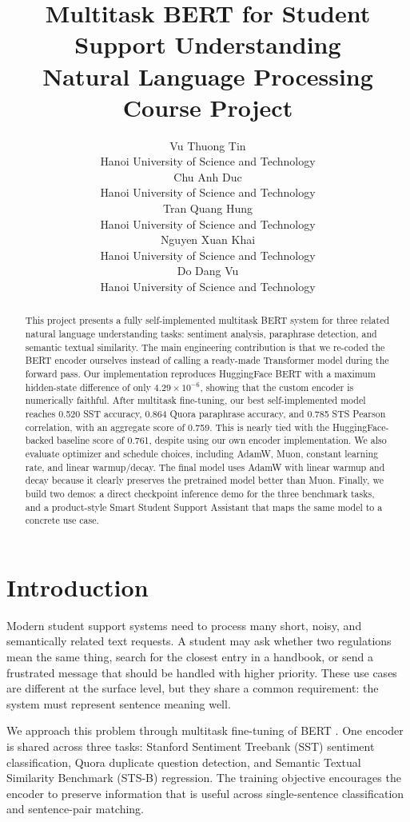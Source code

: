 \documentclass{article}
\title{
  Multitask BERT for Student Support Understanding \\
  \vspace{0.15cm}
  \large \normalfont Natural Language Processing Course Project
}
\author{
  Vu Thuong Tin \\
  Hanoi University of Science and Technology \\
  \And
  Chu Anh Duc \\
  Hanoi University of Science and Technology \\
  \And
  Tran Quang Hung \\
  Hanoi University of Science and Technology \\
  \And
  Nguyen Xuan Khai \\
  Hanoi University of Science and Technology \\
  \And
  Do Dang Vu \\
  Hanoi University of Science and Technology
}
\begin{document}
\maketitle
\vspace{-0.4cm}

\begin{abstract}
This project presents a fully self-implemented multitask BERT system for three related natural language understanding tasks: sentiment analysis, paraphrase detection, and semantic textual similarity. The main engineering contribution is that we re-coded the BERT encoder ourselves instead of calling a ready-made Transformer model during the forward pass. Our implementation reproduces HuggingFace BERT with a maximum hidden-state difference of only $4.29\times10^{-6}$, showing that the custom encoder is numerically faithful. After multitask fine-tuning, our best self-implemented model reaches 0.520 SST accuracy, 0.864 Quora paraphrase accuracy, and 0.785 STS Pearson correlation, with an aggregate score of 0.759. This is nearly tied with the HuggingFace-backed baseline score of 0.761, despite using our own encoder implementation. We also evaluate optimizer and schedule choices, including AdamW, Muon, constant learning rate, and linear warmup/decay. The final model uses AdamW with linear warmup and decay because it clearly preserves the pretrained model better than Muon. Finally, we build two demos: a direct checkpoint inference demo for the three benchmark tasks, and a product-style Smart Student Support Assistant that maps the same model to a concrete use case.
\end{abstract}

\vspace{-0.5cm}

\section{Introduction}

Modern student support systems need to process many short, noisy, and semantically related text requests. A student may ask whether two regulations mean the same thing, search for the closest entry in a handbook, or send a frustrated message that should be handled with higher priority. These use cases are different at the surface level, but they share a common requirement: the system must represent sentence meaning well.

We approach this problem through multitask fine-tuning of BERT \cite{devlin2019bert}. One encoder is shared across three tasks: Stanford Sentiment Treebank (SST) sentiment classification, Quora duplicate question detection, and Semantic Textual Similarity Benchmark (STS-B) regression. The training objective encourages the encoder to preserve information that is useful across single-sentence classification and sentence-pair matching.
\end{document}
